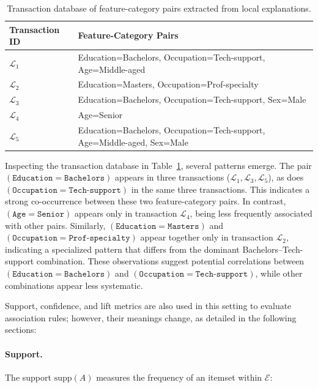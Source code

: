 \begin{table}[H]
  \centering
  \renewcommand{\arraystretch}{1.3}
  \begin{tabularx}{\textwidth}{>{\centering\arraybackslash}p{}|>{\raggedright\arraybackslash}X}
    \toprule
    \textbf{Transaction ID} & \textbf{Feature-Category Pairs} \\
    \midrule
    $\mathcal{L}_1$ & Education=Bachelors, Occupation=Tech-support, Age=Middle-aged \\
    $\mathcal{L}_2$ & Education=Masters, Occupation=Prof-specialty \\
    $\mathcal{L}_3$ & Education=Bachelors, Occupation=Tech-support, Sex=Male \\
    $\mathcal{L}_4$ & Age=Senior \\
    $\mathcal{L}_5$ & Education=Bachelors, Occupation=Tech-support, Age=Middle-aged, Sex=Male \\
    \bottomrule
  \end{tabularx}
  \caption{Transaction database of feature-category pairs extracted from local explanations.}
  \label{tab:feature-category-transactions}
\end{table}

Inspecting the transaction database in Table~\ref{tab:feature-category-transactions}, several patterns emerge. The pair $(\texttt{Education}=\texttt{Bachelors})$ appears in three transactions ($\mathcal{L}_1, \mathcal{L}_3, \mathcal{L}_5$), as does $(\texttt{Occupation}=\texttt{Tech-support})$ in the same three transactions. This indicates a strong co-occurrence between these two feature-category pairs. In contrast, $(\texttt{Age}=\texttt{Senior})$ appears only in transaction $\mathcal{L}_4$, being less frequently associated with other pairs. Similarly, $(\texttt{Education}=\texttt{Masters})$ and $(\texttt{Occupation}=\texttt{Prof-specialty})$ appear together only in transaction $\mathcal{L}_2$, indicating a specialized pattern that differs from the dominant Bachelors--Tech-support combination. These observations suggest potential correlations between $(\texttt{Education}=\texttt{Bachelors})$ and $(\texttt{Occupation}=\texttt{Tech-support})$, while other combinations appear less systematic.

Support, confidence, and lift metrics are also used in this setting to evaluate association rules; however, their meanings change, as detailed in the following sections:

\paragraph{Support.} The support $\mathrm{supp}(A)$ measures the frequency of an itemset within $\mathcal{E}$:

